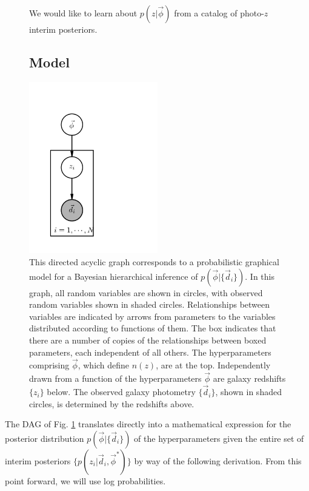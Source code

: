 \documentclass[iop]{emulateapj}
\begin{document}
\begin{figure}
	\begin{center}We would like to learn about $p(z | \vec{\phi})$ from a catalog of photo-$z$ interim posteriors.
		
		\subsection{Model}
		\label{sec:model}
		
		\includegraphics[width=0.5\textwidth]{fig/pgm.png}
		\caption{This directed acyclic graph corresponds to a probabilistic graphical model for a Bayesian hierarchical inference of $p(\vec{\phi}|\{\vec{d}_{i}\})$.  In this graph, all random variables are shown in circles, with observed random variables shown in shaded circles.  Relationships between variables are indicated by arrows from parameters to the variables distributed according to functions of them.  The box indicates that there are a number of copies of the relationships between boxed parameters, each independent of all others.  The hyperparameters comprising $\vec{\phi}$, which define $n(z)$, are at the top.  Independently drawn from a function of the hyperparameters $\vec{\phi}$ are galaxy redshifts $\{z_{i}\}$ below.  The observed galaxy photometry $\{\vec{d}_{i}\}$, shown in shaded circles, is determined by the redshifts above.}
	\label{fig:pgm}
	\end{center}
\end{figure}

The DAG of Fig. \ref{fig:pgm} translates directly into a mathematical expression for the posterior distribution $p(\vec{\phi} | \{\vec{d}_{i}\})$ of the hyperparameters given the entire set of interim posteriors $\{p(z_{i} | \vec{d}_{i}, \vec{\phi}^{*})\}$ by way of the following derivation.  From this point forward, we will use log probabilities.
\end{document}
